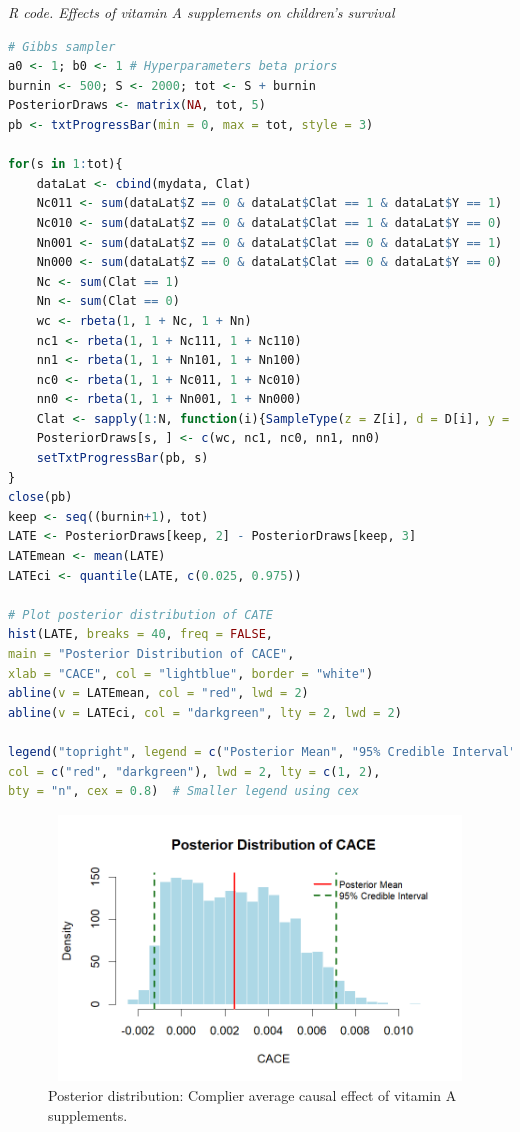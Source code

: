 \begin{tcolorbox}[enhanced,width=4.67in,center upper,
	fontupper=\large\bfseries,drop shadow southwest,sharp corners]
	\textit{R code. Effects of vitamin A supplements on children's survival}
	\begin{VF}
		\begin{lstlisting}[language=R]
# Gibbs sampler
a0 <- 1; b0 <- 1 # Hyperparameters beta priors
burnin <- 500; S <- 2000; tot <- S + burnin 
PosteriorDraws <- matrix(NA, tot, 5)
pb <- txtProgressBar(min = 0, max = tot, style = 3)

for(s in 1:tot){
	dataLat <- cbind(mydata, Clat)
	Nc011 <- sum(dataLat$Z == 0 & dataLat$Clat == 1 & dataLat$Y == 1)
	Nc010 <- sum(dataLat$Z == 0 & dataLat$Clat == 1 & dataLat$Y == 0)
	Nn001 <- sum(dataLat$Z == 0 & dataLat$Clat == 0 & dataLat$Y == 1)
	Nn000 <- sum(dataLat$Z == 0 & dataLat$Clat == 0 & dataLat$Y == 0)
	Nc <- sum(Clat == 1)
	Nn <- sum(Clat == 0)
	wc <- rbeta(1, 1 + Nc, 1 + Nn)
	nc1 <- rbeta(1, 1 + Nc111, 1 + Nc110)
	nn1 <- rbeta(1, 1 + Nn101, 1 + Nn100)
	nc0 <- rbeta(1, 1 + Nc011, 1 + Nc010)
	nn0 <- rbeta(1, 1 + Nn001, 1 + Nn000)
	Clat <- sapply(1:N, function(i){SampleType(z = Z[i], d = D[i], y = Y[i], wc = wc, nc0 = nc0, nn0 = nn0)})
	PosteriorDraws[s, ] <- c(wc, nc1, nc0, nn1, nn0)
	setTxtProgressBar(pb, s)
}
close(pb)
keep <- seq((burnin+1), tot)
LATE <- PosteriorDraws[keep, 2] - PosteriorDraws[keep, 3]
LATEmean <- mean(LATE)
LATEci <- quantile(LATE, c(0.025, 0.975))

# Plot posterior distribution of CATE
hist(LATE, breaks = 40, freq = FALSE,
main = "Posterior Distribution of CACE",
xlab = "CACE", col = "lightblue", border = "white")
abline(v = LATEmean, col = "red", lwd = 2)
abline(v = LATEci, col = "darkgreen", lty = 2, lwd = 2)

legend("topright", legend = c("Posterior Mean", "95% Credible Interval"),
col = c("red", "darkgreen"), lwd = 2, lty = c(1, 2),
bty = "n", cex = 0.8)  # Smaller legend using cex
\end{lstlisting}
	\end{VF}
\end{tcolorbox} 

\begin{figure}[h!]
	\includegraphics[width=340pt, height=200pt]{Chapters/chapter12/figures/CACE.png}
	\caption[List of figure caption goes here]{Posterior distribution: Complier average causal effect of vitamin A supplements.}\label{fig12_CACE}
\end{figure}

